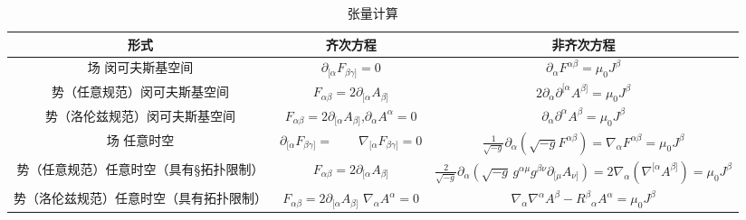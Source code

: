 \begin{table}[ht]
\centering
\caption{张量计算}\label{MAXS3}
\begin{tabular}{|c|c|c|}
\hline \textbf{形式} & \textbf{齐次方程} & \textbf{非齐次方程} \\
\hline 场 闵可夫斯基空间 & \(\partial_{[\alpha} F_{\beta \gamma]} = 0\)& \(\partial_{\alpha} F^{\alpha \beta} = \mu_0 J^{\beta}\) \\
\hline 势（任意规范）闵可夫斯基空间 & \({\displaystyle F_{\alpha \beta }=2\partial _{[\alpha }A_{\beta ]}}\)&\(2 \partial_{\alpha} \partial^{[\alpha} A^{\beta]} = \mu_{0} J^{\beta}\) \\
\hline 势（洛伦兹规范）闵可夫斯基空间&\({\displaystyle F_{\alpha \beta }=2\partial _{[\alpha }A_{\beta ]}}\),\(\partial _{\alpha }A^{\alpha }=0\)&\(\partial _{\alpha }\partial ^{\alpha }A^{\beta }=\mu _{0}J^{\beta }\)\\
\hline 场  任意时空&\(\partial_{[\alpha} F_{\beta \gamma]} =\qquad \nabla_{[\alpha} F_{\beta \gamma]} = 0\)&\(\frac{1}{\sqrt{-g}} \partial_{\alpha} (\sqrt{-g} F^{\alpha \beta}) = \nabla_{\alpha} F^{\alpha \beta} = \mu_0 J^{\beta}\)\\
\hline 势（任意规范）任意时空（具有§拓扑限制）& \( F_{\alpha \beta }=2\partial _{[\alpha }A_{\beta ]} \)& \(\frac{2}{\sqrt{-g}} \partial_{\alpha} (\sqrt{-g} \, g^{\alpha \mu} g^{\beta \nu} \partial_{[\mu} A_{\nu]}) = 2 \nabla_{\alpha} ( \nabla^{[\alpha} A^{\beta]}) = \mu_{0} J^{\beta}\)\\
\hline 势（洛伦兹规范）任意时空（具有拓扑限制）&\( F_{\alpha \beta }=2\partial _{[\alpha }A_{\beta ]} \)  \( \nabla _{\alpha }A^{\alpha }=0 \) & \(\nabla _{\alpha } \nabla ^{\alpha } A^{\beta } - R^{\beta }{}_{\alpha } A^{\alpha } = \mu _{0} J^{\beta }\)\\
\hline 
\end{tabular}
\end{table}

